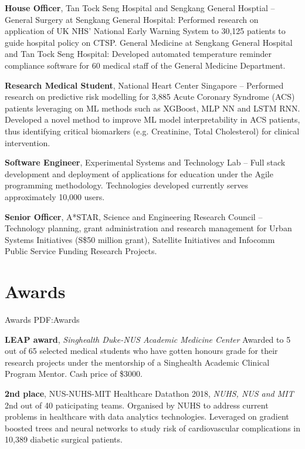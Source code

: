\documentclass[letterpaper,10pt,oneside]{article}
\begin{document}
\begin{body}
{\textbf{House Officer}, Tan Tock Seng Hospital and Sengkang General Hosptial}
\hfill
{} --
\BulletItem
General Surgery at Sengkang General Hospital: Performed research on application of UK NHS' National Early Warning System to 30,125 patients to guide hospital policy on CTSP.
\BulletItem
General Medicine at Sengkang General Hospital and Tan Tock Seng Hospital: Developed automated temperature reminder compliance software for 60 medical staff of the General Medicine Department.

{\textbf{Research Medical Student}, National Heart Center Singapore}
\hfill
{} --  
\BulletItem 
Performed research on predictive risk modelling for 3,885 Acute Coronary Syndrome (ACS) patients leveraging on ML methods such as XGBoost, MLP NN and LSTM RNN.
\BulletItem
Developed a novel method to improve ML model interpretability in ACS patients, thus identifying critical biomarkers (e.g. Creatinine, Total Cholesterol) for clinical intervention.

{\textbf{Software Engineer}, Experimental Systems and Technology Lab}
\hfill
{} --
\BulletItem
Full stack development and deployment of applications for education under the Agile programming methodology. Technologies developed currently serves approximately 10,000 users.

{\textbf{Senior Officer}, A*STAR, Science and Engineering Research Council}
\hfill
{} --
\BulletItem
Technology planning, grant administration and research management for Urban Systems Initiatives (S\$50 million grant), Satellite Initiatives and Infocomm Public Service Funding Research Projects.


\section
{Awards}
{Awards}
{PDF:Awards}

\textbf{LEAP award}, \textit{Singhealth Duke-NUS Academic Medicine Center}
\hfill{}
\GapNoBreak
\BulletItem
Awarded to 5 out of 65 selected medical students who have gotten honours grade for their research projects under the mentorship of a Singhealth Academic Clinical Program Mentor. Cash price of \$3000.
\GapNoBreak
\medskip

\textbf{2nd place}, \textcolor{mygray}{NUS-NUHS-MIT Healthcare Datathon 2018}, \textit{NUHS, NUS and MIT}
\hfill{}
\GapNoBreak
\BulletItem
2nd out of 40 paticipating teams. Organised by NUHS to address current problems in healthcare with data analytics technologies. Leveraged on gradient boosted trees and neural networks to study risk of cardiovascular complications in 10,389 diabetic surgical patients.
\GapNoBreak
\medskip


\end{body}
\end{document}
